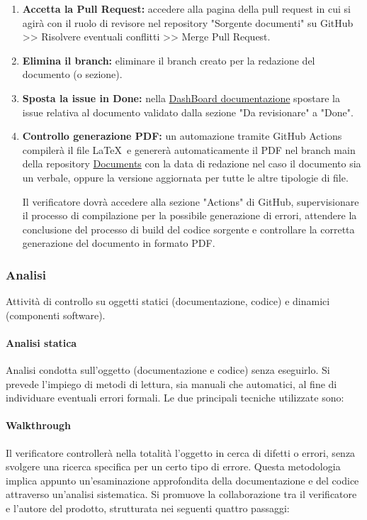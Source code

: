 \begin{enumerate}
    \item \textbf{Accetta la Pull Request:} 
        accedere alla pagina della pull request in cui si agirà con il ruolo di revisore nel repository "Sorgente documenti" su GitHub >> Risolvere eventuali conflitti >> Merge Pull Request.
    \item \textbf{Elimina il branch:} 
        eliminare il branch creato per la redazione del documento (o sezione).
    \item \textbf{Sposta la issue in Done:} 
        nella \href{https://github.com/orgs/ByteOps-swe/projects/1/views/1}{DashBoard documentazione} spostare la issue relativa al documento validato dalla sezione "Da revisionare" a "Done".
    \item \textbf{Controllo generazione PDF:} 
        un automazione tramite GitHub Actions compilerà il file \LaTeX\ e genererà automaticamente il PDF nel branch main della repository \href{https://github.com/ByteOps-swe/Documents}{Documents} con la data di redazione nel caso il documento sia un verbale, oppure la versione aggiornata per tutte le altre tipologie di file.

        Il verificatore dovrà accedere alla sezione "Actions" di GitHub, supervisionare il processo di compilazione per la possibile generazione di errori, attendere la conclusione del processo di build del codice sorgente e controllare la corretta generazione del documento in formato PDF.
\end{enumerate}

\subsubsection{Analisi}
Attività di controllo su oggetti statici (documentazione, codice) e dinamici (componenti software).

\paragraph{Analisi statica}
Analisi condotta sull'oggetto (documentazione e codice) senza eseguirlo. Si prevede l'impiego di metodi di lettura, sia manuali che automatici, al fine di individuare eventuali errori formali. Le due principali tecniche utilizzate sono:

\paragraph{Walkthrough}
    Il verificatore controllerà nella totalità l’oggetto in cerca di difetti o errori, senza svolgere una ricerca specifica per un certo tipo di errore.
    Questa metodologia implica appunto un'esaminazione approfondita della documentazione e del codice attraverso un'analisi sistematica. Si promuove la collaborazione tra il verificatore e l'autore del prodotto, strutturata nei seguenti quattro passaggi:

